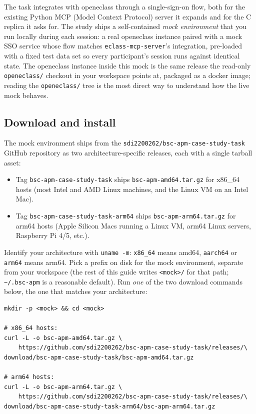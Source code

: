 \documentclass[11pt, a4paper]{article}
\begin{document}
The task integrates with openeclass through a single-sign-on flow, both for the existing Python MCP (Model Context Protocol) server it expands and for the C replica it asks for. The study ships a self-contained \emph{mock environment} that you run locally during each session: a real openeclass instance paired with a mock SSO service whose flow matches \texttt{eclass-mcp-server}'s integration, pre-loaded with a fixed test data set so every participant's session runs against identical state. The openeclass instance inside this mock is the same release the read-only \texttt{openeclass/} checkout in your workspace points at, packaged as a docker image; reading the \texttt{openeclass/} tree is the most direct way to understand how the live mock behaves.

\subsection{Download and install}
\label{sec:env:install}

The mock environment ships from the \texttt{sdi2200262/bsc-apm-case-study-task} GitHub repository as two architecture-specific releases, each with a single tarball asset:

\begin{itemize}
    \item Tag \texttt{bsc-apm-case-study-task} ships \texttt{bsc-apm-amd64.tar.gz} for x86\_64 hosts (most Intel and AMD Linux machines, and the Linux VM on an Intel Mac).
    \item Tag \texttt{bsc-apm-case-study-task-arm64} ships \texttt{bsc-apm-arm64.tar.gz} for arm64 hosts (Apple Silicon Macs running a Linux VM, arm64 Linux servers, Raspberry Pi 4/5, etc.).
\end{itemize}

Identify your architecture with \texttt{uname -m}: \texttt{x86\_64} means amd64, \texttt{aarch64} or \texttt{arm64} means arm64. Pick a prefix on disk for the mock environment, separate from your workspace (the rest of this guide writes \texttt{<mock>/} for that path; \texttt{\textasciitilde/.bsc-apm} is a reasonable default). Run \emph{one} of the two download commands below, the one that matches your architecture:

\begin{verbatim}
mkdir -p <mock> && cd <mock>

# x86_64 hosts:
curl -L -o bsc-apm-amd64.tar.gz \
    https://github.com/sdi2200262/bsc-apm-case-study-task/releases/\
download/bsc-apm-case-study-task/bsc-apm-amd64.tar.gz

# arm64 hosts:
curl -L -o bsc-apm-arm64.tar.gz \
    https://github.com/sdi2200262/bsc-apm-case-study-task/releases/\
download/bsc-apm-case-study-task-arm64/bsc-apm-arm64.tar.gz
\end{verbatim}
\end{document}
